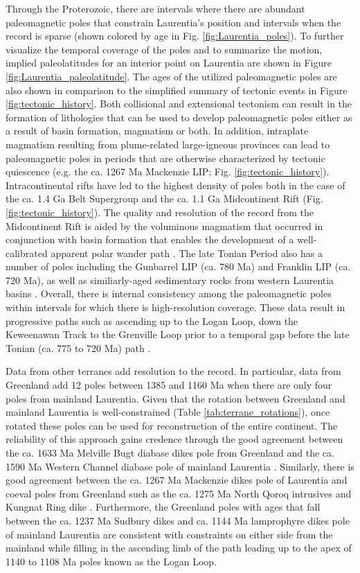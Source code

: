 \documentclass[11pt,letterpaper]{article}
\begin{document}
Through the Proterozoic, there are intervals where there are abundant paleomagnetic poles that constrain Laurentia's position and intervals when the record is sparse (shown colored by age in Fig. \ref{fig:Laurentia_poles}). To further visualize the temporal coverage of the poles and to summarize the motion, implied paleolatitudes for an interior point on Laurentia are shown in Figure \ref{fig:Laurentia_paleolatitude}. The ages of the utilized paleomagnetic poles are also shown in comparison to the simplified summary of tectonic events in Figure \ref{fig:tectonic_history}. Both collisional and extensional tectonism can result in the formation of lithologies that can be used to develop paleomagnetic poles either as a result of basin formation, magmatism or both. In addition, intraplate magmatism resulting from plume-related large-igneous provinces can lead to paleomagnetic poles in periods that are otherwise characterized by tectonic quiescence (e.g. the ca. 1267 Ma Mackenzie LIP; Fig. \ref{fig:tectonic_history}). Intracontinental rifts have led to the highest density of poles both in the case of the ca. 1.4 Ga Belt Supergroup and the ca. 1.1 Ga Midcontinent Rift (Fig. \ref{fig:tectonic_history}). The quality and resolution of the record from the Midcontinent Rift is aided by the voluminous magmatism that occurred in conjunction with basin formation that enables the development of a well-calibrated apparent polar wander path \citep{Swanson-Hysell2019a}. The late Tonian Period also has a number of poles including the Gunbarrel LIP (ca. 780 Ma) and Franklin LIP (ca. 720 Ma), as well as similiarly-aged sedimentary rocks from western Laurentia basins \citep{Eyster2019a}. Overall, there is internal consistency among the paleomagnetic poles within intervals for which there is high-resolution coverage. These data result in progressive paths such as ascending up to the Logan Loop, down the Keweenawan Track \citep{Swanson-Hysell2019a} to the Grenville Loop prior to a temporal gap before the late Tonian (ca. 775 to 720 Ma) path \citep{Eyster2019a}.

Data from other terranes add resolution to the record. In particular, data from Greenland add 12 poles between 1385 and 1160 Ma when there are only four poles from mainland Laurentia. Given that the rotation between Greenland and mainland Laurentia is well-constrained (Table \ref{tab:terrane_rotations}), once rotated these poles can be used for reconstruction of the entire continent. The reliability of this approach gains credence through the good agreement between the ca. 1633 Ma Melville Bugt diabase dikes pole from Greenland \citep{Halls2011a} and the ca. 1590 Ma Western Channel diabase pole of mainland Laurentia \citep{Irving1972a}. Similarly, there is good agreement between the ca. 1267 Ma Mackenzie dikes pole of Laurentia \citep{Buchan2000a} and coeval poles from Greenland such as the ca. 1275 Ma North Qoroq intrusives \citep{Piper1992a} and Kungnat Ring dike \citep{Piper1977a}. Furthermore, the Greenland poles with ages that fall between the ca. 1237 Ma Sudbury dikes and ca. 1144 Ma lamprophyre dikes pole of mainland Laurentia are consistent with constraints on either side from the mainland while filling in the ascending limb of the path leading up to the apex of 1140 to 1108 Ma poles known as the Logan Loop.
\end{document}
